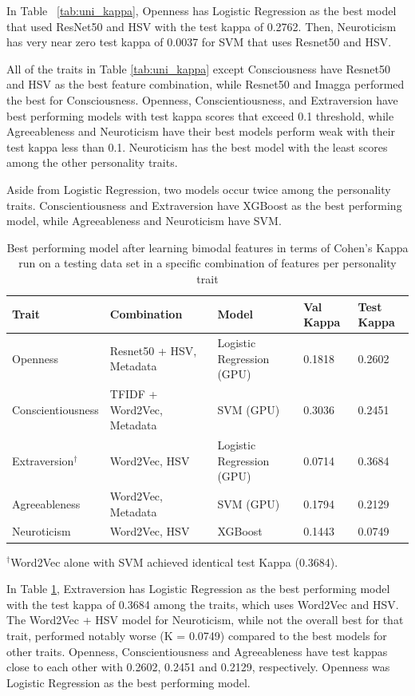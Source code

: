In Table ~\ref{tab:uni_kappa}, Openness has Logistic Regression as the best model that used ResNet50 and HSV with the test kappa of 0.2762. Then, Neuroticism has very near zero test kappa of 0.0037 for SVM that uses Resnet50 and HSV.

All of the traits in Table \ref{tab:uni_kappa} except Consciousness have Resnet50 and HSV as the best feature combination, while Resnet50 and Imagga performed the best for Consciousness. Openness, Conscientiousness, and Extraversion have best performing models with test kappa scores that exceed 0.1 threshold, while Agreeableness and Neuroticism have their best models perform weak with their test kappa less than 0.1. Neuroticism has the best model with the least scores among the other personality traits.

Aside from Logistic Regression, two models occur twice among the personality traits. Conscientiousness and Extraversion have XGBoost as the best performing model, while Agreeableness and Neuroticism have SVM.

\begin{table}[H]
	\centering
	\caption{Best performing model after learning bimodal features in terms of Cohen's Kappa run on a testing data set in a specific combination of features per personality trait}
	\label{tab:bi_kappa}
	\begin{tabularx}{\textwidth}{lX|X|X|l}
		\hline
		\textbf{Trait} & \textbf{Combination} & \textbf{Model} & \textbf{Val Kappa} & \textbf{Test Kappa} \\ \hline
        Openness & Resnet50 + HSV, Metadata & Logistic Regression (GPU) & 0.1818 & 0.2602 \\ \hline
        Conscientiousness & TFIDF + Word2Vec, Metadata & SVM (GPU) & 0.3036 & 0.2451 \\ \hline
        Extraversion$^{\dagger}$ & Word2Vec, HSV & Logistic Regression (GPU) & 0.0714 & 0.3684 \\ \hline
        Agreeableness & Word2Vec, Metadata & SVM (GPU) & 0.1794 & 0.2129 \\ \hline
        Neuroticism & Word2Vec, HSV & XGBoost & 0.1443 & 0.0749 \\ \hline
	\end{tabularx}
	\vspace{0.5\baselineskip}
	\footnotesize{$^{\dagger}$Word2Vec alone with SVM achieved identical test Kappa (0.3684).}
\end{table}

In Table \ref{tab:bi_kappa}, Extraversion has Logistic Regression as the best performing model with the test kappa of 0.3684 among the traits, which uses Word2Vec and HSV. The Word2Vec + HSV model for Neuroticism, while not the overall best for that trait, performed notably worse (K = 0.0749) compared to the best models for other traits. Openness, Conscientiousness and Agreeableness have test kappas close to each other with 0.2602, 0.2451 and 0.2129, respectively. Openness was Logistic  Regression as the best performing model.

